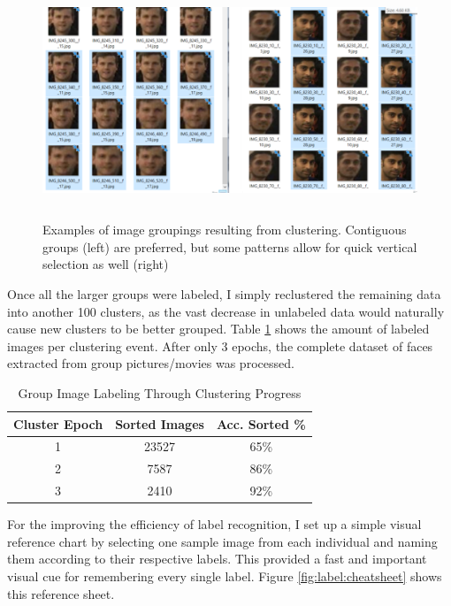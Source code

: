 \documentclass[11pt]{article}
\begin{document}
        \begin{figure}[ht]
            \centering
            \includegraphics[height=7cm]{./Images/labeling/samples_2.png}
            \caption{Examples of image groupings resulting from clustering. Contiguous groups (left) are preferred, but some patterns allow for quick vertical selection as well (right)}
            \label{fig:label:samples}
        \end{figure}

        Once all the larger groups were labeled, I simply reclustered the remaining data into another 100 clusters, as the vast decrease in unlabeled data would naturally cause new clusters to be better grouped. Table \ref{table:cluster_passes} shows the amount of labeled images per clustering event. After only 3 epochs, the complete dataset of faces extracted from group pictures/movies was processed.

        \begin{table}[h!]
            \centering
            \begin{tabular}{||c c c||}
                \hline
                Cluster Epoch & Sorted Images & Acc. Sorted \% \\ [0.5ex]
                \hline\hline
                1 & 23527 &  65\% \\
                \hline
                2 & 7587 &  86\% \\
                \hline
                3 & 2410 & 92\% \\
                \hline
           \end{tabular}
           \caption{Group Image Labeling Through Clustering Progress}
            \label{table:cluster_passes}
        \end{table}

        For the improving the efficiency of label recognition, I set up a simple visual reference chart by selecting one sample image from each individual and naming them according to their respective labels. This provided a fast and important visual cue for remembering every single label. Figure \ref{fig:label:cheatsheet} shows this reference sheet.
\end{document}
